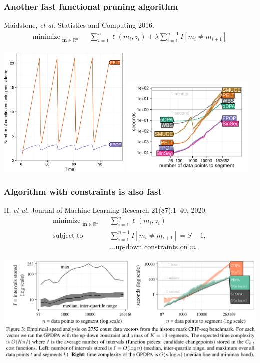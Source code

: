 \documentclass{beamer}
\DeclareMathOperator*{\minimize}{minimize}
\newcommand{\RR}{\mathbb R}
\begin{document}
\begin{frame}
  \frametitle{Another fast functional pruning algorithm}
  Maidstone, {\it et al.} Statistics and Computing 2016.
\vskip -0.5cm
\begin{align*}
    \minimize_{\substack{
  \mathbf m\in\RR^{n}
  }} &\ \ 
    \sum_{i=1}^n \ell( m_i,  z_i)  + \lambda{\sum_{i=1}^{n-1}I[m_{i}\neq m_{i+1}]}
  \nonumber 
\end{align*}

\centering
  \includegraphics[width=0.48\textwidth]{screenshot-Maidstone-figure-4}
\includegraphics[width=0.48\textwidth]{figure-systemtime-arrays-bins}
  
\end{frame}

\begin{frame}
  \frametitle{Algorithm with constraints is also fast}
  H, {\it et al.} Journal of Machine Learning Research 21(87):1--40, 2020. 
\vskip -0.5cm
  \begin{align*}
    \minimize_{\substack{
  \mathbf m\in\RR^{n}
  }} &\ \ 
    \sum_{i=1}^n \ell( m_i,  z_i) 
\\
      \text{subject to} &\ \ {{\sum_{i=1}^{n-1} I[m_i\neq m_{i+1}]}=S-1,}
  \nonumber\\
  &\ \ \text{...up-down constraints on $m$.}
  \nonumber 
\end{align*}

\includegraphics[width=\textwidth]{screenshot-GPDPA-intervals}

\end{frame}
\end{document}

